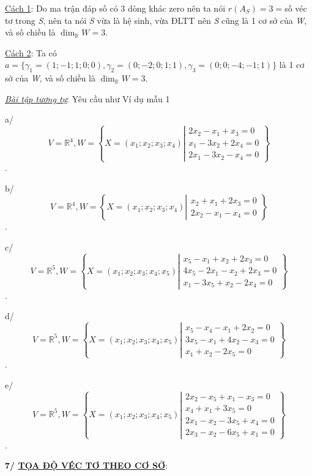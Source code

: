 \documentclass[12pt,a4paper]{article}
\newcommand{\ul}[1]{\uline{#1}}
\begin{document}
\ul{Cách 1}: Do ma trận đáp số có 3 dòng khác zero nên ta nói
$r(A_S) = 3 =$số véc tơ trong
\emph{S}, nên ta nói \emph{S} vừa là hệ sinh, vừa ĐLTT nên \emph{S} cũng
là 1 cơ sở của \emph{W}, và số chiều là
$\dim_{\mathbb{R}} W = 3$.

\ul{Cách 2}: Ta có $a = \{ \gamma_1 = (1; -1; 1; 0; 0), \gamma_2 = (0; -2; 0; 1; 1), \gamma_3 = (0; 0; -4; -1; 1) \}$ là
1 cơ sở của \emph{W}, và số chiều là
$\dim_{\mathbb{R}} W = 3$.

\emph{\ul{Bài tập tương tự}}: Yêu cầu như Ví dụ mẫu 1

a/ \[V = \mathbb{R}^4, W = \left\{ X = (x_1; x_2; x_3; x_4) \left| \begin{matrix} 2x_2 - x_1 + x_3 = 0 \\ x_1 - 3x_2 + 2x_4 = 0 \\ 2x_1 - 3x_2 - x_4 = 0 \end{matrix} \right. \right\}\].

b/ \[V = \mathbb{R}^4, W = \left\{ X = (x_1; x_2; x_3; x_4) \left| \begin{matrix} x_2 + x_1 + 2x_3 = 0 \\ 2x_2 - x_1 - x_4 = 0 \end{matrix} \right. \right\}\].

c/ \[V = \mathbb{R}^5, W = \left\{ X = (x_1; x_2; x_3; x_4; x_5) \left| \begin{matrix} x_5 - x_1 + x_2 + 2x_3 = 0 \\ 4x_5 - 2x_1 - x_2 + 2x_3 = 0 \\ x_1 - 3x_5 + x_2 - 2x_4 = 0 \end{matrix} \right. \right\}\].

d/ \[V = \mathbb{R}^5, W = \left\{ X = (x_1; x_2; x_3; x_4; x_5) \left| \begin{matrix} x_5 - x_4 - x_1 + 2x_2 = 0 \\ 3x_5 - x_1 + 4x_2 - x_3 = 0 \\ x_1 + x_2 - 2x_5 = 0 \end{matrix} \right. \right\}\].

e/ \[V = \mathbb{R}^5, W = \left\{ X = (x_1; x_2; x_3; x_4; x_5) \left| \begin{matrix} 2x_2 - x_5 + x_1 - x_3 = 0 \\ x_4 + x_1 + 3x_5 = 0 \\ 2x_1 - x_2 - 3x_5 + x_4 = 0 \\ 2x_3 - x_2 - 6x_5 + x_1 = 0 \end{matrix} \right. \right\}\].

\textbf{7/ \ul{TỌA ĐỘ VÉC TƠ THEO CƠ SỞ}}:
\end{document}
